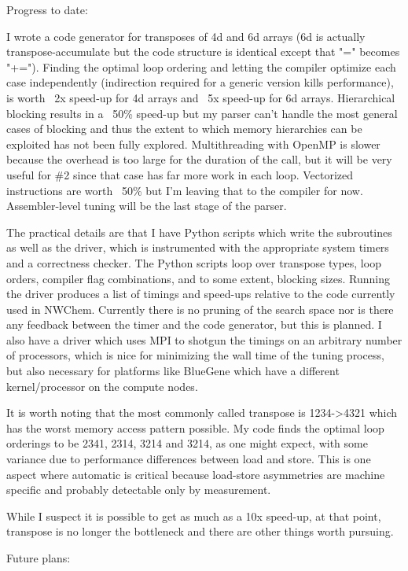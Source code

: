 \documentclass[letterpaper,12pt]{article}
\begin{document}
Progress to date:

I wrote a code generator for transposes of 4d and 6d arrays (6d is actually transpose-accumulate but the code structure is identical except that "=" becomes "+=").  Finding the optimal loop ordering and letting the compiler optimize each case independently (indirection required for a generic version kills performance), is worth ~2x speed-up for 4d arrays and ~5x speed-up for 6d arrays.  Hierarchical blocking results in a ~50\% speed-up but my parser can't handle the most general cases of blocking and thus the extent to which memory hierarchies can be exploited has not been fully explored.  Multithreading with OpenMP is slower because the overhead is too large for the duration of the call, but it will be very useful for \#2 since that case has far more work in each loop.  Vectorized instructions are worth ~50\% but I'm leaving that to the compiler for now.  Assembler-level tuning will be the last stage of the parser.

The practical details are that I have Python scripts which write the subroutines as well as the driver, which is instrumented with the appropriate system timers and a correctness checker.  The Python scripts loop over transpose types, loop orders, compiler flag combinations, and to some extent, blocking sizes.  Running the driver produces a list of timings and speed-ups relative to the code currently used in NWChem.  Currently there is no pruning of the search space nor is there any feedback between the timer and the code generator, but this is planned.  I also have a driver which uses MPI to shotgun the timings on an arbitrary number of processors, which is nice for minimizing the wall time of the tuning process, but also necessary for platforms like BlueGene which have a different kernel/processor on the compute nodes.

It is worth noting that the most commonly called transpose is 1234->4321 which has the worst memory access pattern possible.  My code finds the optimal loop orderings to be 2341, 2314, 3214 and 3214, as one might expect, with some variance due to performance differences between load and store.  This is one aspect where automatic is critical because load-store asymmetries are machine specific and probably detectable only by measurement.

While I suspect it is possible to get as much as a 10x speed-up, at that point, transpose is no longer the bottleneck and there are other things worth pursuing.

Future plans:
\end{document}
